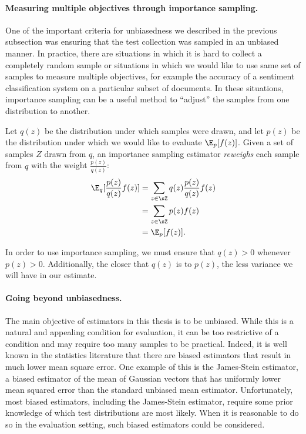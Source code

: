 \paragraph{Measuring multiple objectives through importance sampling.}
One of the important criteria for unbiasedness we described in the previous subsection was ensuring that the test collection was sampled in an unbiased manner.
In practice, there are situations in which it is hard to collect a completely random sample or situations in which we would like to use same set of samples to measure multiple objectives, for example the accuracy of a sentiment classification system on a particular subset of documents.
In these situations, importance sampling can be a useful method to ``adjust'' the samples from one distribution to another.

Let $q(z)$ be the distribution under which samples were drawn, and let $p(z)$ be the distribution under which we would like to evaluate $\E_p[f(z)]$.
Given a set of samples $Z$ drawn from $q$, an importance sampling estimator \textit{reweighs}  each sample from $q$ with the weight $\frac{p(z)}{q(z)}$:
\begin{align}
  \E_q[\frac{p(z)}{q(z)} f(z)] 
  &= \sum_{z \in \sZ} q(z) \frac{p(z)}{q(z)} f(z) \\
  &= \sum_{z \in \sZ} p(z) f(z) \\
  &= \E_p[f(z)].
\end{align}

In order to use importance sampling, we must ensure that $q(z) > 0$ whenever $p(z) > 0$.
Additionally, the closer that $q(z)$ is to $p(z)$, the less variance we will have in our estimate.

\paragraph{Going beyond unbiasedness.}
The main objective of estimators in this thesis is to be unbiased.
While this is a natural and appealing condition for evaluation, it can be too restrictive of a condition and may require too many samples to be practical.
Indeed, it is well known in the statistics literature that there are biased estimators that result in much lower mean square error.
One example of this is the James-Stein estimator, a biased estimator of the mean of Gaussian vectors that has uniformly lower mean squared error than the standard unbiased mean estimator.
Unfortunately, most biased estimators, including the James-Stein estimator, require some prior knowledge of which test distributions are most likely.
When it is reasonable to do so in the evaluation setting, such biased estimators could be considered.
